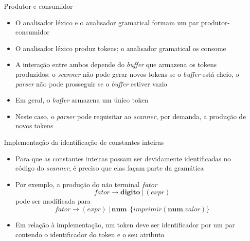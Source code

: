 \begin{frame}[fragile]{Produtor e consumidor}

    \begin{itemize}
        \item O analisador léxico e o analisador gramatical formam um par produtor-consumidor
        \pause

        \item O analisador léxico produz tokens; o analisador gramatical os consome
        \pause

        \item A interação entre ambos depende do \textit{buffer} que armazena os tokens produzidos: o \textit{scanner} não pode gerar novos tokens se o
            \textit{buffer} está cheio, o \textit{parser} não pode prosseguir se o \textit{buffer} estiver vazio
        \pause

        \item Em geral, o \textit{buffer} armazena um único token
        \pause

        \item Neste caso, o \textit{parser} pode requisitar ao \textit{scanner}, por demanda, a produção de novos tokens
    \end{itemize}

\end{frame}

\begin{frame}[fragile]{Implementação da identificação de constantes inteiras}

    \begin{itemize}
        \item Para que as constantes inteiras possam ser devidamente identificadas no código do \textit{scanner}, é preciso que elas façam parte da
            gramática
        \pause

        \item Por exemplo, a produção do não terminal $fator$ 
        \[
            fator \to \mathbf{digito}\ |\ (expr)
        \]
        pode ser modificada para
        \[
            fator \to (expr)\ |\ \mathbf{num}\ \ \{imprimir(\mathbf{num}.valor)\}
        \]
        \pause

        \item Em relação à implementação, um token deve ser identificador por um par contendo o identificador do token e o seu atributo
    \end{itemize}

\end{frame}

